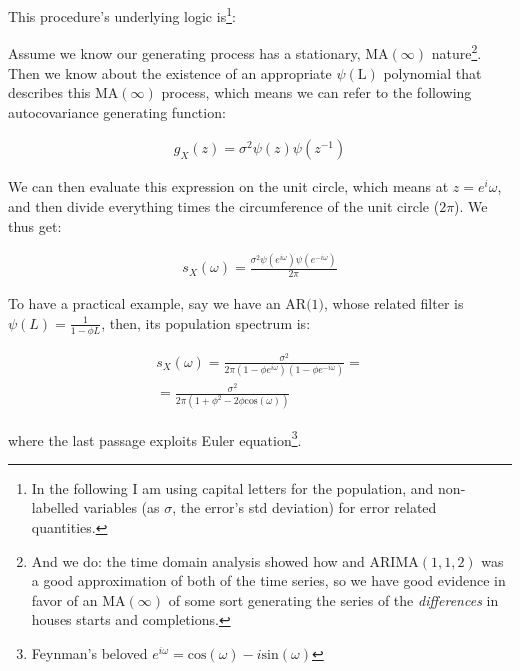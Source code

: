 \documentclass[12pt]{article} %
\begin{document}
This procedure's underlying logic is\footnote{In the following I am using capital letters for the population, and non-labelled variables (as $\sigma$, the error's std deviation) for error related quantities.}: 

Assume we know our generating process has a stationary, $\text{MA}(\infty)$ nature\footnote{
And we do: the time domain analysis showed how and $\text{ARIMA}(1,1,2)$ was a good approximation of both of the time series, so we have good evidence in favor of an $\text{MA}(\infty)$ of some sort generating the series of the {\em differences} in houses starts and completions.}. Then we know about the existence of an appropriate $\psi(\text{L})$ polynomial that describes this $\text{MA}(\infty)$ process, which means we can refer to the following autocovariance generating function:

\begin{equation}
\begin{aligned}
g_X(z)=\sigma^2\psi(z)\psi(z^{-1})
\end{aligned}
\end{equation}

We can then evaluate this expression on the unit circle, which means at $z=e^i\omega$, and then divide everything times the circumference of the unit circle ($2\pi$). We thus get:

\begin{equation}
\begin{aligned}
s_X(\omega)=\frac{\sigma^2\psi(e^{i\omega})\psi(e^{-i\omega})}{2\pi}
\end{aligned}
\end{equation}

To have a practical example, say we have an $\text{AR(1)}$, whose related filter is $\psi(L)=\frac{1}{1-\phi L}$, then, its population spectrum is:

\begin{equation}
\begin{aligned}
s_X(\omega)=\frac{\sigma^2}{2\pi(1-\phi e^{i\omega})(1-\phi e^{-i\omega})}=\\
=\frac{\sigma^2}{2\pi(1+\phi^2-2\phi\text{cos}(\omega))}
\end{aligned}
\end{equation}

where the last passage exploits Euler equation\footnote{
Feynman's beloved $e^{i\omega}=\text{cos}(\omega)-i\text{sin}(\omega)$}.
\end{document}
